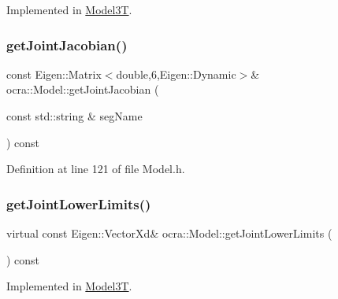 Implemented in \hyperlink{classModel3T_a6fd62404b6e74f239142c6a4de76d7e9}{Model3T}.

\hypertarget{classocra_1_1Model_a0adc740df0aff2f5da852421933fa493}{}\label{classocra_1_1Model_a0adc740df0aff2f5da852421933fa493} 
\subsubsection{\texorpdfstring{get\+Joint\+Jacobian()}{getJointJacobian()}\hspace{0.1cm}{\footnotesize\ttfamily [2/2]}}
{\footnotesize\ttfamily const Eigen\+::\+Matrix$<$double,6,Eigen\+::\+Dynamic$>$\& ocra\+::\+Model\+::get\+Joint\+Jacobian (\begin{DoxyParamCaption}\item[{const std\+::string \&}]{seg\+Name }\end{DoxyParamCaption}) const\hspace{0.3cm}{\ttfamily [inline]}}



Definition at line 121 of file Model.\+h.

\hypertarget{classocra_1_1Model_ade47bb5ea3029b3d5652109d1ec6df7f}{}\label{classocra_1_1Model_ade47bb5ea3029b3d5652109d1ec6df7f} 
\subsubsection{\texorpdfstring{get\+Joint\+Lower\+Limits()}{getJointLowerLimits()}}
{\footnotesize\ttfamily virtual const Eigen\+::\+Vector\+Xd\& ocra\+::\+Model\+::get\+Joint\+Lower\+Limits (\begin{DoxyParamCaption}{ }\end{DoxyParamCaption}) const\hspace{0.3cm}{\ttfamily [pure virtual]}}



Implemented in \hyperlink{classModel3T_aea8da0b07db1efd0a8f578f0afad2372}{Model3T}.

\hypertarget{classocra_1_1Model_ac88c445f37e5bf7302aa19b8e986013b}{}\label{classocra_1_1Model_ac88c445f37e5bf7302aa19b8e986013b} 

